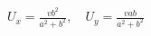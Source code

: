\documentclass[border=2.5pt]{standalone}
\begin{document}
$\displaystyle \boxed{U_x=\frac{vb^2}{a^2+b^2},\quad U_y=\frac{vab}{a^2+b^2}}$
\end{document}

